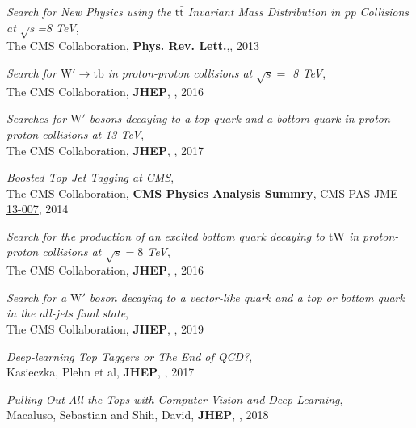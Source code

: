 \documentclass[12pt]{article}
\begin{document}
\begin{flushleft}
\begin{thebibliography}{1}


  \textit{Search for New Physics using the $\mathrm{t\bar{t}}$ Invariant Mass Distribution in pp Collisions at $\sqrt{s}$=8  TeV},\\
 The CMS Collaboration, \textbf{Phys. Rev. Lett.},{}, 2013

  \textit{Search for $\mathrm{W' \to tb}$ in proton-proton collisions at $\sqrt{s} = $ 8 TeV},\\
 The CMS Collaboration, \textbf{JHEP}, , 2016

  \textit{Searches for $\mathrm{W'}$ bosons decaying to a top quark and a bottom quark in proton-proton collisions at 13 TeV}, \\
  The CMS Collaboration, \textbf{JHEP}, , 2017



 \textit{Boosted Top Jet Tagging at CMS},\\
 The CMS Collaboration, \textbf{CMS Physics Analysis Summry}, \href{http://cms-physics.web.cern.ch/cms-physics/public/JME-13-007-pas.pdf}{{\color{blue}\underline{CMS PAS JME-13-007}}}, 2014


  \textit{Search for the production of an excited bottom quark decaying to $\mathrm{tW}$ in proton-proton collisions at $ \sqrt{s}=8 $ TeV},\\
The CMS Collaboration, \textbf{JHEP}, , 2016



  \textit{Search for a $\mathrm{W'}$ boson decaying to a vector-like quark and a top or bottom quark in the all-jets final state},\\
The CMS Collaboration, \textbf{JHEP}, , 2019

  \textit{Deep-learning Top Taggers or The End of QCD?},\\
 Kasieczka, Plehn et al, \textbf{JHEP}, , 2017

  \textit{Pulling Out All the Tops with Computer Vision and Deep Learning},\\
 Macaluso, Sebastian and Shih, David, \textbf{JHEP}, , 2018



\end{thebibliography}
\end{flushleft}
\end{document}
